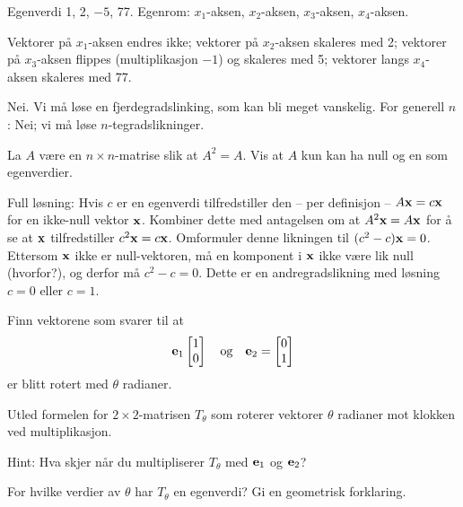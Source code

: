 \begin{losning}

\begin{punkt}
Egenverdi 1, 2, $-5$, 77. Egenrom: $x_1$-aksen, $x_2$-aksen, $x_3$-aksen, $x_4$-aksen.
\end{punkt}

\begin{punkt}
Vektorer på $x_1$-aksen endres ikke; vektorer på $x_2$-aksen skaleres med 2; vektorer på $x_3$-aksen flippes (multiplikasjon $-1$) og skaleres med 5; vektorer langs $x_4$-aksen skaleres med 77.
\end{punkt}

\begin{punkt}
Nei. Vi må løse en fjerdegradslinking, som kan bli meget vanskelig. For generell $n$: Nei; vi må løse $n$-tegradslikninger.
\end{punkt}

\end{losning}



\begin{oppgave}
La $A$ være en $n\times n$-matrise slik at $A^2=A$. Vis at $A$ kun kan ha null og en som egenverdier.
\end{oppgave}

\begin{losning}
Full løsning: Hvis $c$ er en egenverdi tilfredstiller den -- per definisjon -- $A\mathbf{x}=c\mathbf{x}$ for en ikke-null vektor $\mathbf{x}$. Kombiner dette med antagelsen om at $A^2\mathbf{x}=A\mathbf{x}$ for å se at $\mathbf{x}$ tilfredstiller $c^2\mathbf{x}=c\mathbf{x}$. Omformuler denne likningen til $(c^2-c)\mathbf{x}=0$. Ettersom $\mathbf{x}$ ikke er null-vektoren, må en komponent i $\mathbf{x}$ ikke være lik null (hvorfor?), og derfor må $c^2-c=0$. Dette er en andregradslikning med løsning $c=0$ eller $c=1$.
\end{losning}

\begin{oppgave}

\begin{punkt}
Finn vektorene som svarer til at $$\mathbf{e}_1\begin{bmatrix} 1 \\ 0 \end{bmatrix}\quad \text{og}\quad\mathbf{e}_2= \begin{bmatrix} 0 \\ 1 \end{bmatrix}$$ er blitt rotert med $\theta$ radianer.
\end{punkt}

\begin{punkt}
Utled formelen for $2 \times 2$-matrisen $T_\theta$ som roterer vektorer $\theta$ radianer mot klokken ved multiplikasjon.

\noindent
Hint: Hva skjer når du multipliserer $T_\theta$ med $\mathbf{e}_1$ og $\mathbf{e}_2$?
\end{punkt}

\begin{punkt}
For hvilke verdier av $\theta$ har $T_\theta$ en egenverdi? Gi en geometrisk forklaring.
\end{punkt}


\end{oppgave}


